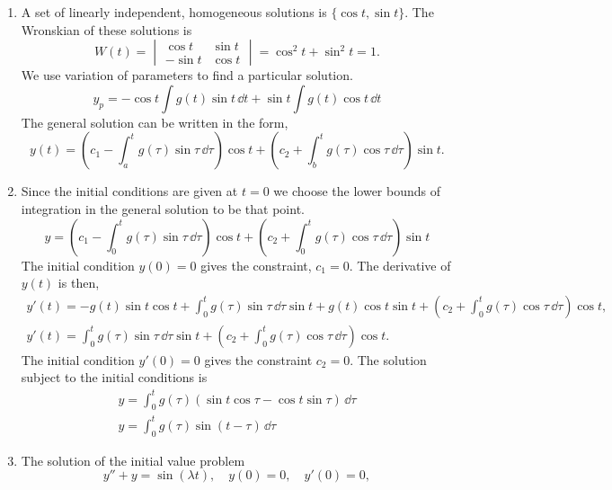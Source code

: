 {%
\begin{Solution}
  \label{solution resonant non-resonant forcing}
  \begin{enumerate}
  \item
    A set of linearly independent, homogeneous solutions is $\{\cos t, \sin t\}$.
    The Wronskian of these solutions is
    \[
    W(t) =
    \begin{vmatrix}
      \cos t & \sin t \\
      - \sin t & \cos t
    \end{vmatrix}
    = \cos^2 t + \sin^2 t = 1.
    \]
    We use variation of parameters to find a particular solution.
    \[
    y_p = - \cos t \int g(t) \sin t \,\dd t + \sin t \int g(t) \cos t \,\dd t
    \]
    The general solution can be written in the form,
    \[
    \boxed{
      y(t) = \left( c_1 - \int_a^t g(\tau) \sin \tau \,\dd \tau \right) \cos t
      + \left( c_2 + \int_b^t g(\tau) \cos \tau \,\dd \tau \right) \sin t.
      }
    \]
  \item
    Since the initial conditions are given at $t = 0$ we choose the lower bounds
    of integration in the general solution to be that point.
    \[
    y = \left( c_1 - \int_0^t g(\tau) \sin \tau \,\dd \tau \right) \cos t
    + \left( c_2 + \int_0^t g(\tau) \cos \tau \,\dd \tau \right) \sin t
    \]
    The initial condition $y(0) = 0$ gives the constraint, $c_1 = 0$.
    The derivative of $y(t)$ is then,
    \begin{gather*}
      y'(t) = - g(t) \sin t \cos t + \int_0^t g(\tau) \sin \tau \,\dd \tau \sin t
      + g(t) \cos t \sin t
      + \left( c_2 + \int_0^t g(\tau) \cos \tau \,\dd \tau \right) \cos t, \\
      y'(t) = \int_0^t g(\tau) \sin \tau \,\dd \tau \sin t
      + \left( c_2 + \int_0^t g(\tau) \cos \tau \,\dd \tau \right) \cos t.
    \end{gather*}
    The initial condition $y'(0) = 0$ gives the constraint $c_2 = 0$.
    The solution subject to the initial conditions is
    \begin{gather*}
      y = \int_0^t g(\tau) (\sin t \cos \tau - \cos t \sin \tau) \,\dd \tau \\
      \boxed{
        y = \int_0^t g(\tau) \sin (t-\tau) \,\dd \tau
        }
    \end{gather*}
  \item
    The solution of the initial value problem
    \[
    y'' + y = \sin(\lambda t), \quad y(0) = 0, \quad y'(0) = 0,
\]
\end{enumerate}
\end{Solution}}
